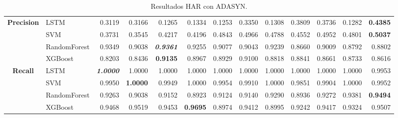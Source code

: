 \begin{table}[H]
\begin{adjustbox}{max width=12cm}
\begin{tabular}{|c|l|r|r|r|r|r|r|r|r|r|r|r|}
			\hline
			\textbf{Precision} &  LSTM &  0.3119 &  0.3166 &  0.1265 &  0.1334 &  0.1253 &  0.3350 &  0.1308 &  0.3809 &  0.3736 &  0.1282 & \textbf{  0.4385 } \\
			&  SVM &  0.3731 &  0.3545 &  0.4217 &  0.4196 &  0.4843 &  0.4966 &  0.4788 &  0.4552 &  0.4952 &  0.4801 & \textbf{  0.5037 } \\
			&  RandomForest &  0.9349 &  0.9038 & \textit{ \textbf{  0.9361 } } &  0.9255 &  0.9077 &  0.9043 &  0.9239 &  0.8660 &  0.9009 &  0.8792 &  0.8802 \\
			&  XGBoost &  0.8203 &  0.8436 & \textbf{  0.9135 } &  0.8967 &  0.8929 &  0.9100 &  0.8818 &  0.8841 &  0.8661 &  0.8733 &  0.8616 \\
			\hline
			\textbf{Recall} &  LSTM & \textit{ \textbf{  1.0000 } } &  1.0000 &  1.0000 &  1.0000 &  1.0000 &  1.0000 &  1.0000 &  1.0000 &  1.0000 &  1.0000 &  0.9953 \\
			&  SVM &  0.9950 & \textbf{  1.0000 } &  0.9949 &  1.0000 &  0.9954 &  0.9910 &  1.0000 &  0.9851 &  0.9904 &  1.0000 &  0.9952 \\
			&  RandomForest &  0.9263 &  0.9038 &  0.9152 &  0.8923 &  0.9124 &  0.9140 &  0.9290 &  0.8936 &  0.9272 &  0.9381 & \textbf{  0.9494 } \\
			&  XGBoost &  0.9468 &  0.9519 &  0.9453 & \textbf{  0.9695 } &  0.8974 &  0.9412 &  0.8995 &  0.9242 &  0.9417 &  0.9324 &  0.9507 \\
			\hline
		\end{tabular}
	\end{adjustbox}
	\caption{Resultados HAR con ADASYN.}
	\label{tab:HAR_ADASYN}
\end{table}

